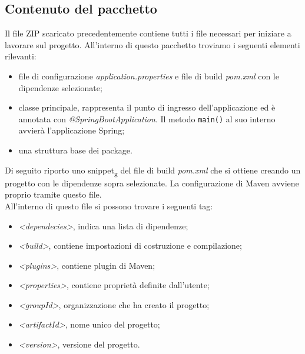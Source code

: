 \subsection{Contenuto del pacchetto}
Il file ZIP scaricato precedentemente contiene tutti i file necessari per iniziare a lavorare sul progetto. All'interno di questo pacchetto troviamo i seguenti elementi rilevanti:
\begin{itemize}
\item file di configurazione \textit{application.properties} e file di build \textit{pom.xml} con le dipendenze selezionate;
\item classe principale, rappresenta il punto di ingresso dell'applicazione ed è annotata con \textit{@SpringBootApplication}. Il metodo \texttt{main()} al suo interno avvierà l'applicazione Spring;
\item una struttura base dei package.
\end{itemize}
Di seguito riporto uno snippet\textsubscript{g} del file di build \textit{pom.xml} che si ottiene creando un progetto con le dipendenze sopra selezionate. La configurazione di Maven avviene proprio tramite questo file.\\
All'interno di questo file si possono trovare i seguenti tag:
\begin{itemize}
\item \textit{<dependecies>}, indica una lista di dipendenze;
\item \textit{<build>}, contiene impostazioni di costruzione e compilazione;
\item \textit{<plugins>}, contiene plugin di Maven;
\item \textit{<properties>}, contiene proprietà definite dall'utente;
\item \textit{<groupId>}, organizzazione che ha creato il progetto;
\item \textit{<artifactId>}, nome unico del progetto;
\item \textit{<version>},  versione del progetto.
\end{itemize}

